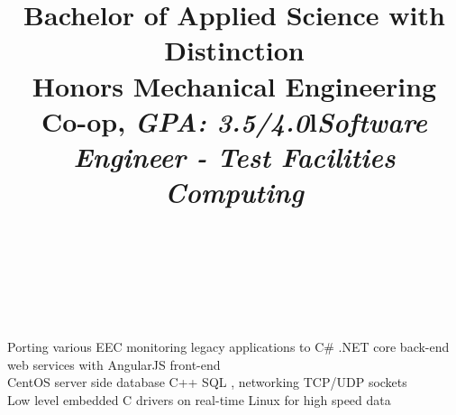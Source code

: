 \documentclass[mm]{res}
\begin{document}
\begin{resume}
\title{Bachelor of Applied Science with Distinction\\
Honors Mechanical Engineering Co-op, \textsl{GPA: 3.5/4.0}}
\begin{position}
\end{position}

\toprule

\section{\headingexperience}
\begin{format}
\\
\title{l}\\
\body\\
\end{format}

\title{\textsl{Software Engineer - Test Facilities Computing}}
\begin{position}
\tb Porting various EEC monitoring legacy applications to C\# .NET core back-end web services with AngularJS front-end\\
\tb CentOS server side database C++ SQL , networking TCP/UDP sockets \\
\tb Low level embedded C drivers on real-time Linux for high speed data
\end{position}


\end{resume}
\end{document}
